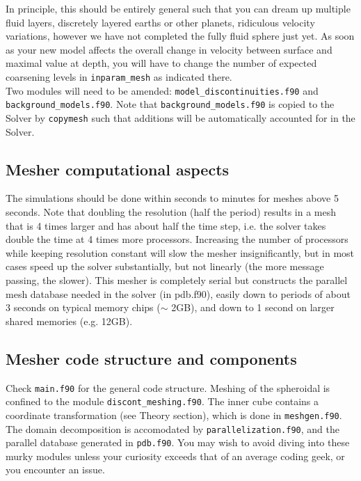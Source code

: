 \documentclass[11pt,letter,fleqn,english,notitlepage]{article}
\begin{document}
\noindent In principle, this should be entirely general such that you can dream up multiple fluid layers,
discretely layered earths or other planets, ridiculous velocity variations, 
however we have not completed the fully fluid sphere just yet. As soon as your new 
model affects the overall change in velocity between surface and maximal value at depth, you 
will have to change the number of expected coarsening levels in {\tt inparam\_mesh} as indicated there.\\

\noindent Two modules will need to be amended: {\tt model\_discontinuities.f90} and {\tt background\_models.f90}.
Note that {\tt background\_models.f90} is copied to the Solver by {\tt copymesh} 
such that additions will be automatically accounted for in the Solver. 

\subsection{Mesher computational aspects}
The simulations should be done within seconds to minutes for meshes above 5 seconds.
Note that doubling the resolution (half the period) results in a mesh that 
is 4 times larger and has about half the time step, i.e. the solver takes 
double the time at 4 times more processors. Increasing the number of 
processors while keeping resolution constant will slow the mesher insignificantly, 
but in most cases speed up the solver substantially, but not linearly
(the more message passing, the slower).
This mesher is completely serial but constructs the parallel mesh database 
needed in the solver (in pdb.f90), easily down to periods of about 
3 seconds on typical memory chips ($\sim$ 2GB), and down to 1 second on 
larger shared memories (e.g. 12GB).

\subsection{Mesher code structure and components}
Check {\tt main.f90} for the general code structure. Meshing of the spheroidal is confined to the module 
{\tt discont\_meshing.f90}. The inner cube contains a coordinate transformation (see Theory section), which 
is done in {\tt meshgen.f90}. The domain decomposition is accomodated by {\tt parallelization.f90}, and the 
parallel database generated in {\tt pdb.f90}. You may wish to avoid diving into these murky modules 
unless your curiosity exceeds that of an average coding geek, or you encounter an issue.\\
\end{document}
